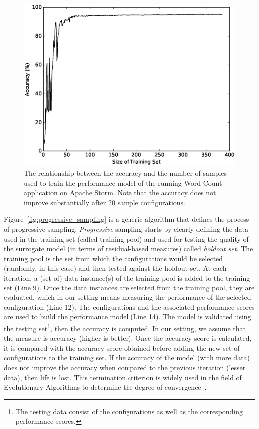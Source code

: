 \begin{figure}[t]
\centering
\includegraphics[scale=0.4]{Figures/figure1.eps}
\caption{{\small The relationship between the accuracy and the number of samples used to train the performance model of the running Word Count application on Apache Storm. Note that the accuracy does not improve substantially after 20 sample configurations.}
}
\label{fig:learning_curve}
\end{figure}





Figure~\ref{fig:progressive_sampling} is a generic algorithm that defines the process of progressive sampling. \emph{Progressive} sampling starts by clearly defining the data used in the training set (called training pool) and used for testing the quality of the surrogate model (in terms of residual-based measures) called \textit{holdout set}. The training pool is the set from which the configurations would be selected (randomly, in this case) and then tested against the holdout set. At each iteration, a (set of) data instance(s) of the training pool is added to the training set (Line 9). Once the data instances are selected from the training pool, they are evaluated, which in our setting means measuring the performance of the selected configuration (Line 12). The configurations and the associated performance scores are used to build the performance model (Line 14). The model is validated using the testing set\footnote{The testing data consist of the configurations as well as the corresponding performance scores.}, then the accuracy is computed. In our setting, we assume that the measure is accuracy (higher is better). Once the accuracy score is calculated, it is compared with the accuracy score obtained before adding the new set of configurations to the training set. If the accuracy of the model (with more data) does not improve the accuracy when compared to the previous iteration (lesser data), then life is lost. This termination criterion is widely used in the field of Evolutionary Algorithms to determine the degree of convergence~\cite{krall2015gale}.


